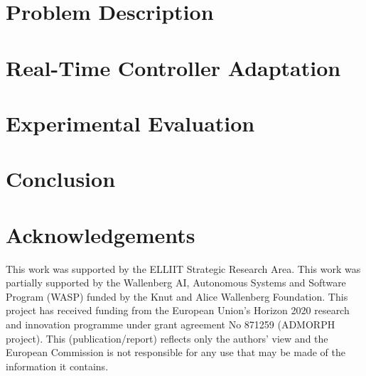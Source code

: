 \section{Problem Description}
\label{sec:problem-descr}
%

\section{Real-Time Controller Adaptation}
\label{sec:darc}
%

\section{Experimental Evaluation}
\label{sec:results}
%

\section{Conclusion}
\label{sec:conclusion}
%

\section*{Acknowledgements}
This work was supported by the ELLIIT Strategic Research Area.
This work was partially supported by the Wallenberg AI, Autonomous Systems and Software Program (WASP) funded by the Knut and Alice Wallenberg Foundation.
This project has received funding from the European Union's Horizon 2020 research and innovation programme under grant agreement No 871259 (ADMORPH project). This (publication/report) reflects only the authors' view and the European Commission is not responsible for any use that may be made of the information it contains.


\printbibliography[heading=subbibliography]
